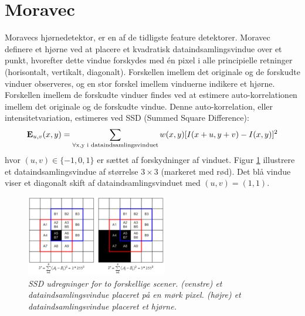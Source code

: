 \section{Moravec}\label{sec:moravec}
Moravecs hjørnedetektor\cite{moravec}, er en af de tidligste feature detektorer. Moravec definere et hjørne ved at placere et kvadratisk dataindsamlingsvindue over et punkt, hvorefter dette vindue forskydes med én pixel i alle principielle retninger (horisontalt, vertikalt, diagonalt). Forskellen imellem det originale og de forskudte vinduer observeres, og en stor forskel imellem vinduerne indikere et hjørne. Forskellen imellem de forskudte vinduer findes ved at estimere auto-korrelationen imellem det originale og de forskudte vindue. Denne auto-korrelation, eller intensitetvariation, estimeres ved SSD (Summed Square Difference):
\begin{equation}
\bold{E}_{u,v}(x,y)= \sum_{\forall \text{x,y i dataindsamlingsvinduet}} w(x,y)[I(x+u,y+v) - I(x,y)]^2
\label{moravec}     
\end{equation}
hvor $(u,v)\in \lbrace -1,0,1 \rbrace$ er sættet af forskydninger af vinduet.
Figur \ref{fig:moravec} illustrere et dataindsamlingsvindue af størrelse $3\times3$ (markeret med rød). Det blå vindue viser et diagonalt skift af dataindsamlingsvinduet med $(u,v)=(1,1)$.
\begin{figure}[H]
    \centering
    \includegraphics[width=0.55\textwidth]{fig/25.png}
     \vspace{-1em}
    \begin{center}    
       \caption{{\footnotesize \textit{SSD udregninger for to forskellige scener. (venstre) et dataindsamlingsvindue placeret på en mørk pixel. (højre) et dataindsamlingsvindue placeret et hjørne. }}}
    \label{fig:moravec}
     \end{center}
     \vspace{-2.5em}
  \end{figure} \noindent   
